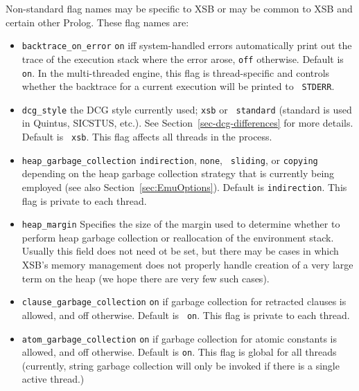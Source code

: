 \begin{description}
Non-standard flag names may be specific to XSB or may be common to XSB
and certain other Prolog.  These flag names are:
\begin{itemize}
%
\item {\tt backtrace\_on\_error} {\tt on} iff system-handled errors
automatically print out the trace of the execution stack where the
error arose, {\tt off} otherwise. Default is {\tt on}.  In the
multi-threaded engine, this flag is thread-specific and controls
whether the backtrace for a current execution will be printed to {\tt
  STDERR}.
%
\item {\tt dcg\_style}  the DCG style currently used; {\tt xsb} or {\tt
  standard} (standard is used in Quintus, SICSTUS, etc.).  See
Section~\ref{sec-dcg-differences} for more details. Default is {\tt
  xsb}. This flag affects all threads in the process.
%
%
\item {\tt heap\_garbage\_collection}  {\tt indirection}, {\tt none}, {\tt
  sliding}, or {\tt copying} depending on the heap garbage collection
strategy that is currently being employed (see also
Section~\ref{sec:EmuOptions}).  Default is {\tt indirection}.  This
flag is private to each thread.  
%
\item {\tt heap\_margin} Specifies the size of the margin used to
  determine whether to perform heap garbage collection or reallocation
  of the environment stack.  Usually this field does not need ot be
  set, but there may be cases in which XSB's memory management does
  not properly handle creation of a very large term on the heap (we
  hope there are very few such cases).
%
\item {\tt clause\_garbage\_collection}  {\tt on} if garbage collection for
retracted clauses is allowed, and off otherwise. Default is {\tt
  on}.  This flag is private to each thread.  
%
\item {\tt atom\_garbage\_collection}  {\tt on} if garbage collection for
atomic constants is allowed, and off otherwise. Default is {\tt on}.
This flag is global for all threads (currently, string garbage
collection will only be invoked if there is a single active thread.)


\end{itemize}
\end{description}
